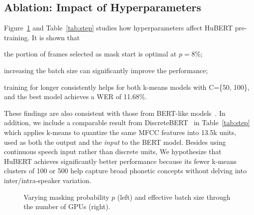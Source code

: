 \subsection{Ablation: Impact of Hyperparameters}
Figure~\ref{fig:prob_bs} and Table~\ref{tab:step} studies how hyperparameters affect HuBERT pre-training.
It is shown that
\begin{enumerate*}[label=(\arabic*)]
    \item the portion of frames selected as mask start is optimal at $p=$8\%;
    \item increasing the batch size can significantly improve the performance; %
    \item training for longer consistently helps for both k-means models with C=\{50, 100\}, and the best model achieves a WER of 11.68\%.
\end{enumerate*}
These findings are also consistent with those from BERT-like models~\cite{clark2020electra}. In addition, we include a comparable result from DiscreteBERT~\cite{baevski2019effectiveness} in Table~\ref{tab:step} which applies k-means to quantize the same MFCC features into 13.5k units, used as both the output and the \textit{input} to the BERT model. Besides using continuous speech input rather than discrete units, We hypothesize that HuBERT achieves significantly better performance because its fewer k-means clusters of 100 or 500 help capture broad phonetic concepts without delving into inter/intra-speaker variation. 

\begin{table}[ht]
    \centering
    
    \caption{Varying the number of HuBERT pre-training steps. $p$ is set to 6.5\%.}
    \label{tab:step}
\end{table}

\begin{figure}[ht]
  \centering
  \begin{subfigure}[b]{0.49\linewidth}
    \centering
    
  \end{subfigure}
  \begin{subfigure}[b]{0.49\linewidth}
    \centering
    
  \end{subfigure}
  \caption{Varying masking probability $p$ (left) and effective batch size through the number of GPUs (right).}
  \label{fig:prob_bs}
\end{figure}

